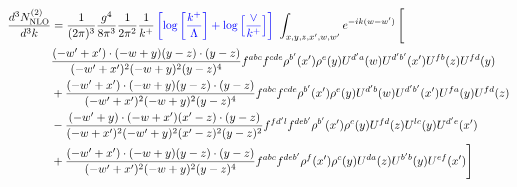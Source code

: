 \documentclass[aps,prd,amsmath,amssymb,nofootinbib]{revtex4-2}
\numberwithin{equation}{section}
\begin{document}
\begin{align}
    \frac{d^{3}N^{(2)}_{\rm NLO}}{d^{3}k} & = \frac{1}{(2\pi)^{3}}\frac{g^{4}}{8\pi^{3}}\frac{1}{2\pi^{2}} \frac{1}{k^{+}}\,{\color{blue}\left[\log{\left[\frac{k^{+}}{\Lambda}\right]}+\log{\left[\frac{\vee}{k^{+}}\right]}\right]}\,\,\int_{x,y,z,x^{\prime},w,w^{\prime}}e^{-ik(w-w^{\prime})}\, \Bigg[\notag \\ &  \frac{( - w' + x') \cdot ( - w + y) (y - z) \cdot (y - z)}{( - w' + x')^{2} ( - w + y)^{2} (y - z)^{4}} f^{a b c} f^{c d e} \rho^{b'}(x') \rho^{e}(y) U^{d' a}(w) U^{d' b'}(x') U^{f b}(z) U^{f d}(y)\nonumber\\
        &+ \frac{( - w' + x') \cdot ( - w + y) (y - z) \cdot (y - z)}{( - w' + x')^{2} ( - w + y)^{2} (y - z)^{4}} f^{a b c} f^{c d e} \rho^{b'}(x') \rho^{e}(y) U^{d' b}(w) U^{d' b'}(x') U^{f a}(y) U^{f d}(z)\nonumber\\
    &- \frac{( - w' + y) \cdot ( - w + x') (x' - z) \cdot (y - z)}{( - w + x')^{2} ( - w' + y)^{2} (x' - z)^{2} (y - z)^{2}} f^{f d' l} f^{d e b'} \rho^{b'}(x') \rho^{c}(y) U^{fd}(z) U^{lc}(y) U^{d' e}(x')\nonumber\\
    & + \frac{( - w' + x') \cdot ( - w + y) (y - z) \cdot (y - z)}{( - w' + x')^{2} ( - w + y)^{2} (y - z)^{4}} f^{a b c} f^{d e b'} \rho^{f}(x') \rho^{c}(y) U^{da}(z) U^{b'b}(y) U^{e f}(x')\Bigg]
\end{align}
\end{document}
